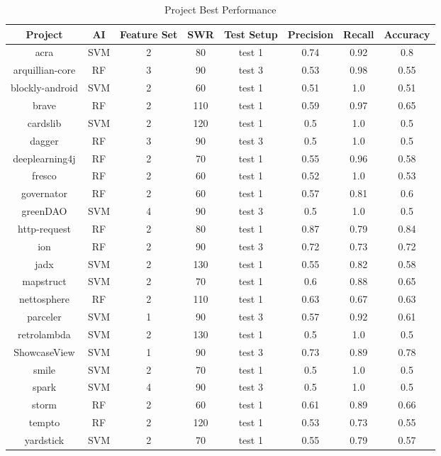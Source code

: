 \begin{table}
\begin{center}
    \begin{tabular}{|c|c|c|c|c|c|c|c|}
        \hline
        Project & AI & Feature Set & SWR & Test Setup & Precision & Recall & Accuracy \\
        \hline
        acra & SVM & 2 & 80 & test 1 & 0.74 & 0.92 & 0.8 \\          %
        arquillian-core & RF & 3 & 90 & test 3 & 0.53 & 0.98 & 0.55 \\
        blockly-android & SVM & 2 & 60 & test 1 & 0.51 & 1.0 & 0.51 \\
        brave & RF & 2 & 110 & test 1 & 0.59 & 0.97 & 0.65 \\
        cardslib & SVM & 2 & 120 & test 1 & 0.5 & 1.0 & 0.5 \\
        dagger & RF & 3 & 90 & test 3 & 0.5 & 1.0 & 0.5 \\
        deeplearning4j & RF & 2 & 70 & test 1 & 0.55 & 0.96 & 0.58 \\
        fresco & RF & 2 & 60 & test 1 & 0.52 & 1.0 & 0.53 \\
        governator & RF & 2 & 60 & test 1 & 0.57 & 0.81 & 0.6 \\
        greenDAO & SVM & 4 & 90 & test 3 & 0.5 & 1.0 & 0.5 \\
        http-request & RF & 2 & 80 & test 1 & 0.87 & 0.79 & 0.84 \\   %
        ion & RF & 2 & 90 & test 3 & 0.72 & 0.73 & 0.72 \\            %
        jadx & SVM & 2 & 130 & test 1 & 0.55 & 0.82 & 0.58 \\
        mapstruct & SVM & 2 & 70 & test 1 & 0.6 & 0.88 & 0.65 \\
        nettosphere & RF & 2 & 110 & test 1 & 0.63 & 0.67 & 0.63 \\
        parceler & SVM & 1 & 90 & test 3 & 0.57 & 0.92 & 0.61 \\
        retrolambda & SVM & 2 & 130 & test 1 & 0.5 & 1.0 & 0.5 \\
        ShowcaseView & SVM & 1 & 90 & test 3 & 0.73 & 0.89 & 0.78 \\  %
        smile & SVM & 2 & 70 & test 1 & 0.5 & 1.0 & 0.5 \\
        spark & SVM & 4 & 90 & test 3 & 0.5 & 1.0 & 0.5 \\
        storm & RF & 2 & 60 & test 1 & 0.61 & 0.89 & 0.66 \\
        tempto & RF & 2 & 120 & test 1 & 0.53 & 0.73 & 0.55 \\
        yardstick & SVM & 2 & 70 & test 1 & 0.55 & 0.79 & 0.57 \\
        \hline
    \end{tabular}
\end{center}
\caption{Project Best Performance}
\label{tab:project_performance}
\end{table}

